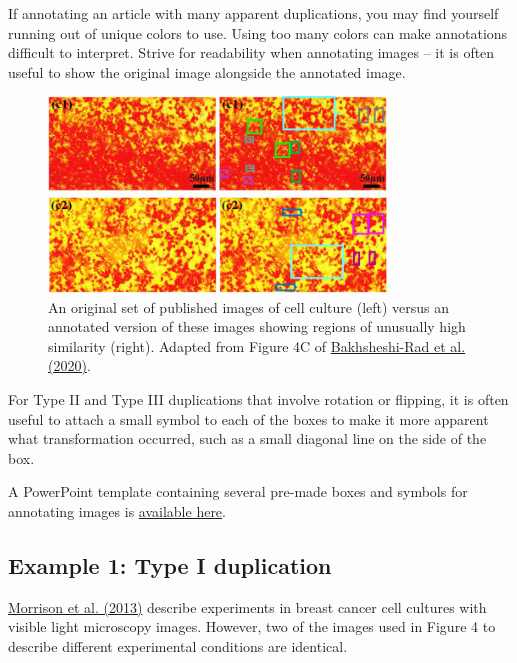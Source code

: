 \documentclass[letterpaper, 12pt]{article}
\begin{document}
If annotating an article with many apparent duplications, you may find yourself running out of unique colors to use. Using too many colors can make annotations difficult to interpret. Strive for readability when annotating images -- it is often useful to show the original image alongside the annotated image.

\begin{figure}[h!tbp]
    \centering
    \includegraphics[width=0.8\textwidth]{img/image_duplication/Bakhsheshi-Rad_annotation.JPG}
    \caption*{An original set of published images of cell culture (left) versus an annotated version of these images showing regions of unusually high similarity (right). Adapted from Figure 4C of \href{https://doi.org/10.1016/j.polymertesting.2019.106298}{Bakhsheshi-Rad et al. (2020)}.}
\end{figure}

For Type II and Type III duplications that involve rotation or flipping, it is often useful to attach a small symbol to each of the boxes to make it more apparent what transformation occurred, such as a small diagonal line on the side of the box. 

A PowerPoint template containing several pre-made boxes and symbols for annotating images is \href{https://osf.io/w3epj}{available here}.

\subsection*{Example 1: Type I duplication}

\href{https://doi.org/10.1172/JCI66764}{Morrison et al. (2013)} describe experiments in breast cancer cell cultures with visible light microscopy images. However, two of the images used in Figure 4 to describe different experimental conditions are identical.
\end{document}
